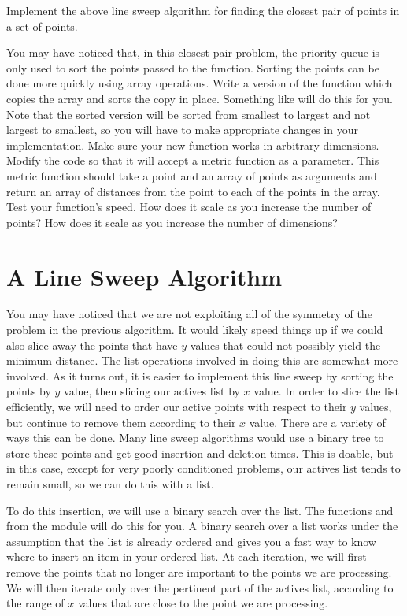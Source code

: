 \begin{problem}
Implement the above line sweep algorithm for finding the closest pair of points in a set of points.
\end{problem}

\begin{problem}
You may have noticed that, in this closest pair problem, the priority queue is only used to sort the points passed to the function. 
Sorting the points can be done more quickly using array operations. 
Write a version of the function which copies the array and sorts the copy in place. 
Something like  will do this for you. 
Note that the sorted version will be sorted from smallest to largest and not largest to smallest, so you will have to make appropriate changes in your implementation.
Make sure your new function works in arbitrary dimensions. 
Modify the code so that it will accept a metric function as a parameter.
This metric function should take a point and an array of points as arguments and return an array of distances from the point to each of the points in the array. 
Test your function's speed. 
How does it scale as you increase the number of points? 
How does it scale as you increase the number of dimensions?
\end{problem}

\section*{A Line Sweep Algorithm}

You may have noticed that we are not exploiting all of the symmetry of the problem in the previous algorithm. 
It would likely speed things up if we could also slice away the points that have $y$ values that could not possibly yield the minimum distance. 
The list operations involved in doing this are somewhat more involved. 
As it turns out, it is easier to implement this line sweep by sorting the points by $y$ value, then slicing our actives list by $x$ value.
In order to slice the list efficiently, we will need to order our active points with respect to their $y$ values, but continue to remove them according to their $x$ value. 
There are a variety of ways this can be done. 
Many line sweep algorithms would use a binary tree to store these points and get good insertion and deletion times. 
This is doable, but in this case, except for very poorly conditioned problems, our actives list tends to remain small, so we can do this with a list. 

To do this insertion, we will use a binary search over the list. 
The functions  and  from the  module will do this for you. 
A binary search over a list works under the assumption that the list is already ordered and gives you a fast way to know where to insert an item in your ordered list. 
At each iteration, we will first remove the points that no longer are important to the points we are processing. 
We will then iterate only over the pertinent part of the actives list, according to the range of $x$ values that are close to the point we are processing.

